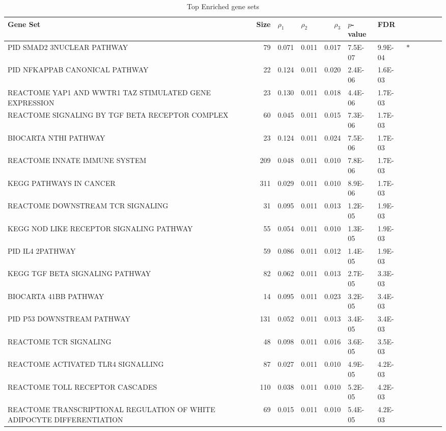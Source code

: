 \documentclass[useAMS,usenatbib, galley]{biom}
\begin{document}
	
		\begin{table*}[ht]
			\centering 
				\caption{Top Enriched gene sets}
			\begin{tabular}{p{3in}rp{0.5in}p{0.5in}rp{0.5in}p{0.5in}rp{0.5in}p{0.5in}lp{0.1in}} 
			\hline
			\hline
			Gene Set & Size & $\rho_1$ & $\rho_2$ & $\rho_3$ & $p$-value & FDR & \\ 
			\hline
			PID SMAD2 3NUCLEAR PATHWAY & 79 & 0.071 & 0.011 & 0.017 & 7.5E-07 & 9.9E-04 & $\ast$ \\ 
			PID NFKAPPAB CANONICAL PATHWAY & 22 & 0.124 & 0.011 & 0.020 & 2.4E-06 & 1.6E-03 &  \\ 
			REACTOME YAP1 AND WWTR1 TAZ STIMULATED GENE EXPRESSION & 23 & 0.130 & 0.011 & 0.018 & 4.4E-06 & 1.7E-03 &  \\ 
			REACTOME SIGNALING BY TGF BETA RECEPTOR COMPLEX & 60 & 0.045 & 0.011 & 0.015 & 7.3E-06 & 1.7E-03 &  \\ 
			BIOCARTA NTHI PATHWAY & 23 & 0.124 & 0.011 & 0.024 & 7.5E-06 & 1.7E-03 &  \\ 
			REACTOME INNATE IMMUNE SYSTEM & 209 & 0.048 & 0.011 & 0.010 & 7.8E-06 & 1.7E-03 &  \\ 
			KEGG PATHWAYS IN CANCER & 311 & 0.029 & 0.011 & 0.010 & 8.9E-06 & 1.7E-03 &  \\ 
			REACTOME DOWNSTREAM TCR SIGNALING & 31 & 0.095 & 0.011 & 0.013 & 1.2E-05 & 1.9E-03 &  \\ 
			KEGG NOD LIKE RECEPTOR SIGNALING PATHWAY & 55 & 0.054 & 0.011 & 0.010 & 1.3E-05 & 1.9E-03 &  \\ 
			PID IL4 2PATHWAY & 59 & 0.086 & 0.011 & 0.012 & 1.4E-05 & 1.9E-03 &  \\ 
			KEGG TGF BETA SIGNALING PATHWAY & 82 & 0.062 & 0.011 & 0.013 & 2.7E-05 & 3.3E-03 &  \\ 
			BIOCARTA 41BB PATHWAY & 14 & 0.095 & 0.011 & 0.023 & 3.2E-05 & 3.4E-03 &  \\ 
			PID P53 DOWNSTREAM PATHWAY & 131 & 0.052 & 0.011 & 0.013 & 3.4E-05 & 3.4E-03 &  \\ 
			REACTOME TCR SIGNALING & 48 & 0.098 & 0.011 & 0.016 & 3.6E-05 & 3.5E-03 &  \\ 
			REACTOME ACTIVATED TLR4 SIGNALLING & 87 & 0.027 & 0.011 & 0.010 & 4.9E-05 & 4.2E-03 &  \\ 
			REACTOME TOLL RECEPTOR CASCADES & 110 & 0.038 & 0.011 & 0.010 & 5.2E-05 & 4.2E-03 &  \\ 
			REACTOME TRANSCRIPTIONAL REGULATION OF WHITE ADIPOCYTE DIFFERENTIATION & 69 & 0.015 & 0.011 & 0.010 & 5.4E-05 & 4.2E-03 &  \\ 

\end{tabular}
\end{table*}
\end{document}
